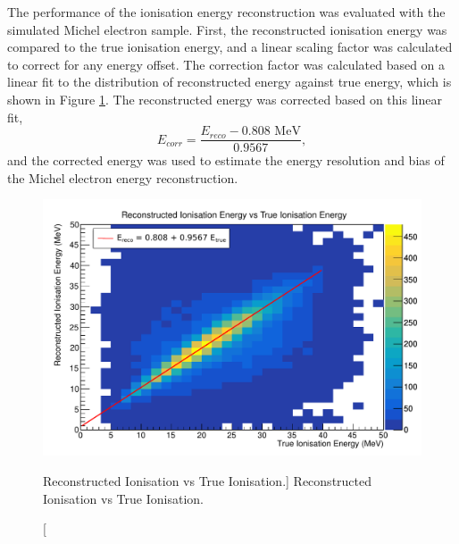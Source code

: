 The performance of the ionisation energy reconstruction was evaluated with the
simulated Michel electron sample. First, the reconstructed ionisation energy was
compared to the true ionisation energy, and a linear scaling factor was
calculated to correct for any energy offset. The correction factor was
calculated based on a linear fit to the distribution of reconstructed energy
against true energy, which is shown in Figure \ref{fig:reco_v_ion}. The
reconstructed energy was corrected based on this linear fit, 
\begin{equation*}
	E_{corr} = \frac{E_{reco}  - 0.808 \mbox{ MeV}}{0.9567},
\end{equation*}
and the corrected energy was used to estimate the energy resolution and bias of
the Michel electron energy reconstruction.
\begin{figure}
	\centering
	\includegraphics[width=\textwidth]{figures/reco_v_true_ion.pdf}
	\caption
	[Reconstructed Ionisation vs True Ionisation.]
	{Reconstructed Ionisation vs True Ionisation.}
	\label{fig:reco_v_ion}
\end{figure}

